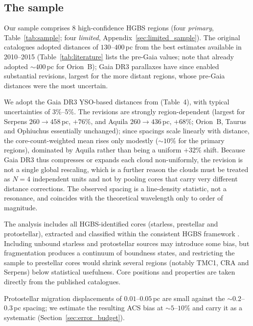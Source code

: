 \documentclass[usenatbib,twoside,twocolumn]{mnras}
\begin{document}
\subsection{The sample}

Our sample comprises 8 high-confidence HGBS regions (four \emph{primary}, Table~\ref{tab:sample}; four \emph{limited}, Appendix~\ref{sec:limited_sample}). The original catalogues \citep{Konyves2015, Konyves2020, Ladjelate2020, Pezzuto2021} adopted distances of $130$--$400$\,pc from the best estimates available in 2010--2015 (Table~\ref{tab:literature} lists the pre-Gaia values; note that \citealt{Konyves2020} already adopted $\sim400$\,pc for Orion~B); Gaia DR3 parallaxes \citep{Zhang2023} have since enabled substantial revisions, largest for the more distant regions, whose pre-Gaia distances were the most uncertain.

We adopt the Gaia DR3 YSO-based distances from \citet{Zhang2023} (Table~4), with typical uncertainties of 3\%--5\%. The revisions are strongly region-dependent (largest for Serpens $260\to458$\,pc, $+76\%$, and Aquila $260\to436$\,pc, $+68\%$; Orion~B, Taurus and Ophiuchus essentially unchanged); since spacings scale linearly with distance, the core-count-weighted mean rises only modestly ($\sim10\%$ for the primary regions), dominated by Aquila rather than being a uniform $+32\%$ shift. Because Gaia DR3 thus compresses or expands each cloud non-uniformly, the revision is not a single global rescaling, which is a further reason the clouds must be treated as $N=4$ independent units and not by pooling cores that carry very different distance corrections. The observed spacing is a line-density statistic, not a resonance, and coincides with the theoretical wavelength only to order of magnitude.

The analysis includes all HGBS-identified cores (starless, prestellar and protostellar), extracted and classified within the consistent HGBS framework \citep{Konyves2015, Konyves2020}. Including unbound starless and protostellar sources may introduce some bias, but fragmentation produces a continuum of boundness states, and restricting the sample to prestellar cores would shrink several regions (notably TMC1, CRA and Serpens) below statistical usefulness. Core positions and properties are taken directly from the published catalogues.

Protostellar migration displacements of $0.01$--$0.05$\,pc \citep{Kirk2016, Mattern2018} are small against the $\sim0.2$--$0.3$\,pc spacing; we estimate the resulting ACS bias at $\sim5$--$10\%$ and carry it as a systematic (Section~\ref{sec:error_budget}).
\end{document}
